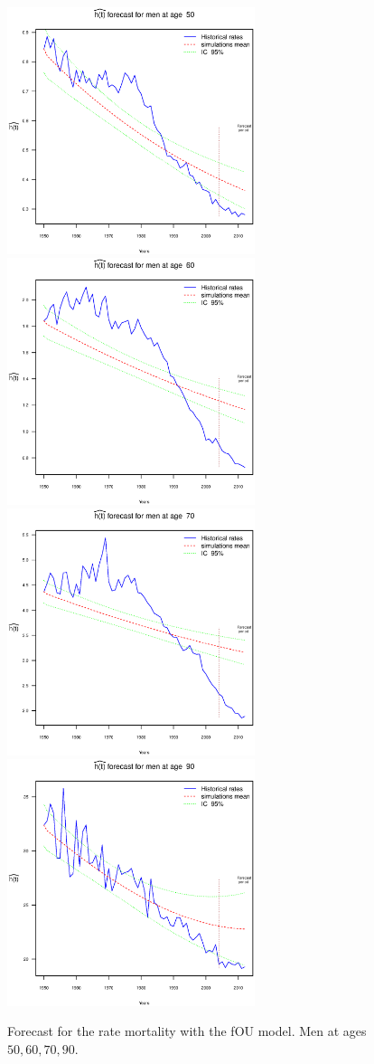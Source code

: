 \documentclass[smallextended]{svjour3}
\begin{document}
\begin{figure}[H]
    \includegraphics[width = 2.85in]{PlotMenForecast50.eps}
    \includegraphics[width = 2.85in]{PlotMenForecast60.eps}
    \includegraphics[width = 2.85in]{PlotMenForecast70.eps}
    \includegraphics[width = 2.85in]{PlotMenForecast90.eps}
    \caption{Forecast for the rate mortality with the fOU model. Men at ages
    $50,60,70,90$.}
    \label{graph-forecast_men_FOU2}
\end{figure}\vspace*{0.1cm}
\end{document}
